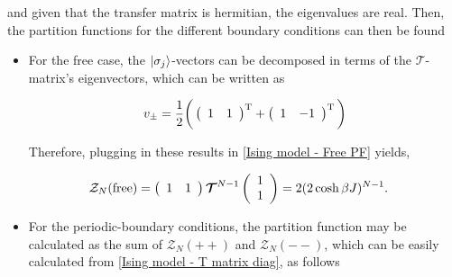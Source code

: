 \documentclass{homework}
\begin{document}
and given that the transfer matrix is hermitian, the eigenvalues are real. Then, the partition functions for the different boundary conditions can then be found

\begin{itemize}
    \item For the free case, the $\ket{\sigma_j}$-vectors can be decomposed in terms of the $\bm{\mathcal{T}}$- matrix's eigenvectors, which can be written as 
    
    $$ 
     v_{\pm}= \frac{1}{2} \bigg(\left(\begin{array}{cc}
     1 & 1 \end{array}\right)^{\textnormal{T}} + \left(\begin{array}{cc}
     1 & -1 \end{array}\right)^{\textnormal{T}} \bigg) 
     $$
     
     Therefore, plugging in these results in \cref{Ising model - Free PF} yields,
     
     \begin{equation}
         \begin{split}
             \mathcal{Z}_N(\textnormal{free}) &= \left(\begin{array}{cc}
        1 & 1 \\
    \end{array}\right) \bm{\mathcal{T}}^{N-1} \left(\begin{array}{c}
        1 \\
        1 
    \end{array}\right) = 2(2\cosh \beta J)^{N-1}.
         \end{split}
     \end{equation}
     
    \item For the periodic-boundary conditions, the partition function may be calculated as the sum of $\mathcal{Z}_N(++)$ and $\mathcal{Z}_N(--)$, which can be easily calculated from \cref{Ising model - T matrix diag}, as follows 
    

\end{itemize}
\end{document}
